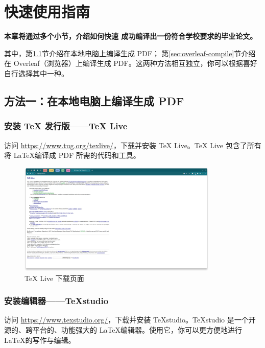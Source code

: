 \chapter{快速使用指南}
\label{ch:quick-start}

\textbf{本章将通过多个小节，介绍如何快速
成功编译出一份符合学校要求的毕业论文。}

其中，第\ref{sec:local-compile}节介绍在本地电脑上编译生成 PDF；
第\ref{sec:overleaf-compile}节介绍在 Overleaf（浏览器）上编译生成 PDF。这两种方法相互独立，你可以根据喜好自行选择其中一种。

\section{方法一：在本地电脑上编译生成 PDF}
\label{sec:local-compile}

\subsection{安装 TeX 发行版——TeX Live}

访问 \url{https://www.tug.org/texlive/}，下载并安装 TeX Live。TeX Live 包含了所有将 \LaTeX 编译成 PDF 所需的代码和工具。

\begin{figure}[H]
  \begin{center}
    \includegraphics[width=0.85\textwidth]{imgs/local-texlive-download.png}
  \end{center}
  \caption{TeX Live 下载页面}
  \label{fig:local-texlive-download}
\end{figure}

\subsection{安装编辑器——TeXstudio}

访问 \url{https://www.texstudio.org/}，下载并安装 TeXstudio。TeXstudio 是一个开源的、跨平台的、功能强大的 \LaTeX 编辑器。使用它，你可以更方便地进行 \LaTeX 的写作与编辑。


